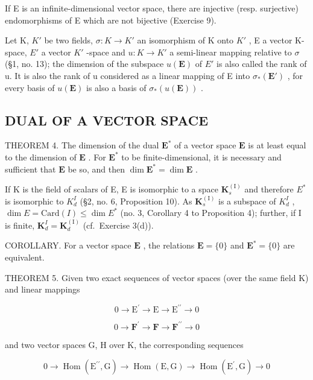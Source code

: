 If E is an infinite-dimensional vector space, there are injective (resp. surjective) endomorphisms of E which are not bijective (Exercise 9).

Let K, \(K'\) be two fields, \(\sigma:K\to K'\) an isomorphism of K onto \(K'\) , E a vector K-space, \(E'\) a vector \(K'\) -space and \(u:K\to K'\) a semi-linear mapping relative to \(\sigma\) (§1, no. 13); the dimension of the subspace \(u(\mathbf{E})\) of \(E'\) is also called the rank of u. It is also the rank of u considered as a linear mapping of E into \(\sigma_{*}(\mathbf{E}')\) , for every basis of \(u(\mathbf{E})\) is also a basis of \(\sigma_{*}(u(\mathbf{E}))\) .

\subsection{DUAL OF A VECTOR SPACE}

THEOREM 4. The dimension of the dual \(\mathbf{E}^*\) of a vector space \(\mathbf{E}\) is at least equal to the dimension of \(\mathbf{E}\) . For \(\mathbf{E}^*\) to be finite-dimensional, it is necessary and sufficient that \(\mathbf{E}\) be so, and then \(\dim \mathbf{E}^* = \dim \mathbf{E}\) .

If K is the field of scalars of E, E is isomorphic to a space \(\mathbf{K}_{s}^{\mathrm{(I)}}\) and therefore \(E^{*}\) is isomorphic to \(K_{d}^{I}\) (§2, no. 6, Proposition 10). As \(\mathbf{K}_{s}^{\mathrm{(I)}}\) is a subspace of \(K_{d}^{I}\) , \(\dim E = \text{Card}(I) \leqslant \dim E^{*}\) (no. 3, Corollary 4 to Proposition 4); further, if I is finite, \(\mathbf{K}_{d}^{I} = \mathbf{K}_{d}^{\mathrm{(I)}}\) (cf.~Exercise 3(d)).

COROLLARY. For a vector space \(\mathbf{E}\) , the relations \(\mathbf{E} = \{0\}\) and \(\mathbf{E}^{*} = \{0\}\) are equivalent.

THEOREM 5. Given two exact sequences of vector spaces (over the same field K) and linear mappings

\[
0 \rightarrow \mathrm{E} ^ {\prime} \rightarrow \mathrm{E} \rightarrow \mathrm{E} ^ {\prime \prime} \rightarrow 0
\]

\[
0 \to \mathbf {F} ^ {\prime} \to \mathbf {F} \to \mathbf {F} ^ {\prime \prime} \to 0
\]

and two vector spaces G, H over K, the corresponding sequences

\[
0 \rightarrow \operatorname{Hom} (\mathrm{E} ^ {\prime \prime}, \mathrm{G}) \rightarrow \operatorname{Hom} (\mathrm{E}, \mathrm{G}) \rightarrow \operatorname{Hom} (\mathrm{E} ^ {\prime}, \mathrm{G}) \rightarrow 0
\]

